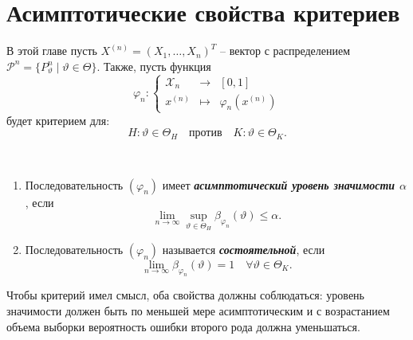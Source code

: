 \chapter{Асимптотические свойства критериев}

В этой главе пусть $X^{(n)}=(X_1, \dots , X_n)^T$ -- вектор с распределением $\mathcal{P}^n=\{P_\vartheta^n \mid \vartheta \in \Theta\}$. Также, пусть функция
\[ \varphi_n :
\left \{
\begin{array}{ccl}
\mathcal{X}_n & \rightarrow & [0, 1] \\
x^{(n)} & \mapsto & \varphi_n(x^{(n)})  
\end{array}
\right.
\]
будет критерием для:
\[H: \vartheta \in \Theta_H \quad \text{против} \quad K: \vartheta \in \Theta_K. \]
 
\begin{defn} \
	\begin{enumerate}
		\item Последовательность $(\varphi_n)$ имеет \textbf{\textit{асимптотический уровень значимости $\alpha$}}, если 
		\[ \lim_{n \rightarrow \infty} \sup_{\vartheta \in \Theta_H} \beta_{\varphi_n}(\vartheta) \leq \alpha. \]
		\item Последовательность $(\varphi_n)$ называется \textbf{\textit{состоятельной}}, если
		\[ \lim_{n \rightarrow \infty} \beta_{\varphi_n}(\vartheta) =1 \quad \forall \vartheta \in \Theta_K. \]
	\end{enumerate}
\end{defn}

\begin{rmrk}
	Чтобы критерий имел смысл, оба свойства должны соблюдаться: уровень значимости должен быть по меньшей мере асимптотическим и с возрастанием объема выборки вероятность ошибки второго рода должна уменьшаться.
\end{rmrk}

